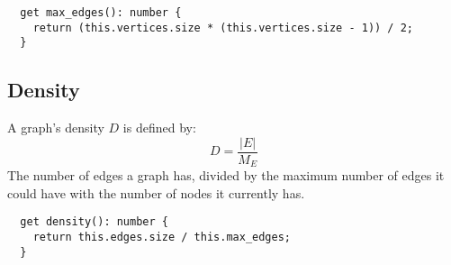 \begin{verbatim}
  get max_edges(): number {
    return (this.vertices.size * (this.vertices.size - 1)) / 2;
  }
\end{verbatim}

\subsection{Density}

A graph's density $D$ is defined by:
$$D=\frac{|E|}{M_E}$$
The number of edges a graph has, divided by the maximum number of edges it could have with the number of nodes it currently has.

\begin{verbatim}
  get density(): number {
    return this.edges.size / this.max_edges;
  }
\end{verbatim}